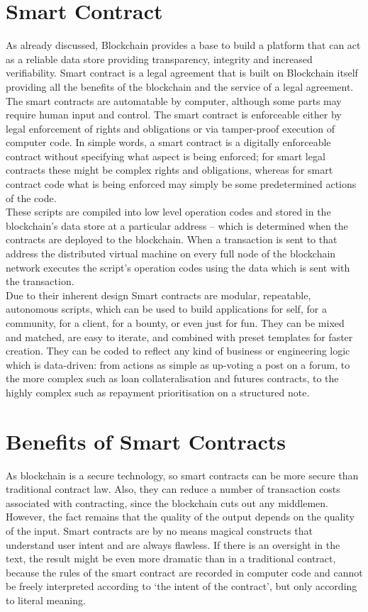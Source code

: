 \section{Smart Contract}
As already discussed, Blockchain provides a base to build a platform that can act as a reliable data store providing transparency, integrity and increased verifiability. Smart contract is a legal agreement that is built on Blockchain itself providing all the benefits of the blockchain and the service of a legal agreement. The smart contracts are automatable by computer, although some parts may require human input and control. The smart contract is enforceable either by legal enforcement of rights and obligations or via tamper-proof execution of computer code.\cite{Clack2016SmartDirections}
In simple words, a smart contract is a digitally enforceable contract without specifying what aspect is being enforced; for smart legal contracts these might be complex rights and obligations, whereas for smart contract code what is being enforced may simply be some predetermined actions of the code.
\\These scripts are compiled into low level operation codes and stored in the blockchain’s data store at a particular address – which is determined when the contracts are deployed to the blockchain. When a transaction is sent to that address the distributed virtual machine on every full node of the blockchain network executes the script’s operation codes using the data which is sent with the transaction. \cite{MonaxContracts}
\\Due to their inherent design Smart contracts are modular, repeatable, autonomous scripts, which can be used to build applications for self, for a community, for a client, for a bounty, or even just for fun. They can be mixed and matched, are easy to iterate, and combined with preset templates for faster creation.
They can be coded to reflect any kind of business or engineering logic which is data-driven: from actions as simple as up-voting a post on a forum, to the more complex such as loan collateralisation and futures contracts, to the highly complex such as repayment prioritisation on a structured note.

\section{Benefits of Smart Contracts}
As blockchain is a secure technology, so smart contracts can be more secure than traditional contract law. Also, they can reduce a number of transaction costs associated with contracting, since the blockchain cuts out any middlemen. However, the fact remains that the quality of the output depends on the quality of the input. Smart contracts are by no means magical constructs that understand user intent and are always flawless. If there is an oversight in the text, the result might be even more dramatic than in a traditional contract, because the rules of the smart contract are recorded in computer code and cannot be freely interpreted according to ‘the intent of the contract’, but only according to literal meaning.

